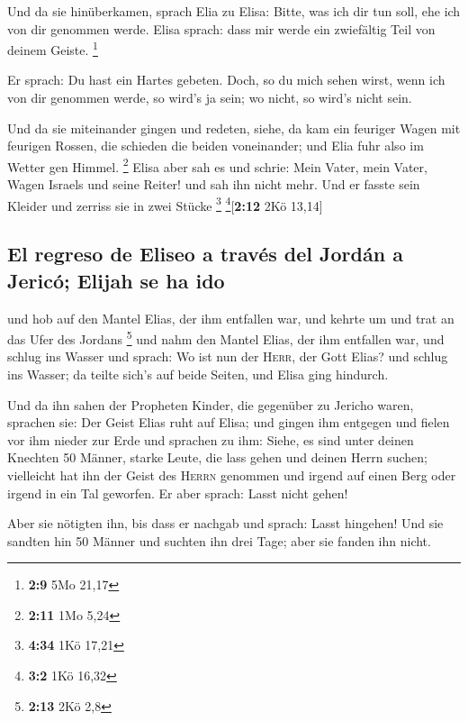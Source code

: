 Und da sie hinüberkamen, sprach Elia zu Elisa: Bitte, was
ich dir tun soll, ehe ich von dir genommen werde. Elisa sprach: dass mir
werde ein zwiefältig Teil von deinem Geiste. \footnote{\textbf{2:9} 5Mo
  21,17}

 Er sprach: Du hast ein Hartes gebeten. Doch, so du mich
sehen wirst, wenn ich von dir genommen werde, so wird's ja sein; wo
nicht, so wird's nicht sein.

 Und da sie miteinander gingen und redeten, siehe, da kam
ein feuriger Wagen mit feurigen Rossen, die schieden die beiden
voneinander; und Elia fuhr also im Wetter gen Himmel. \footnote{\textbf{2:11}
  1Mo 5,24}  Elisa aber sah es und schrie: Mein Vater,
mein Vater, Wagen Israels und seine Reiter! und sah ihn nicht mehr. Und
er fasste sein Kleider und zerriss sie in zwei Stücke \footnote{\textbf{4:34}
  1Kö 17,21} \footnote{\textbf{3:2} 1Kö 16,32}{[}\textbf{2:12} 2Kö
13,14{]}

\hypertarget{el-regreso-de-eliseo-a-travuxe9s-del-jorduxe1n-a-jericuxf3-elijah-se-ha-ido}{%
\subsection{El regreso de Eliseo a través del Jordán a Jericó; Elijah se
ha
ido}\label{el-regreso-de-eliseo-a-travuxe9s-del-jorduxe1n-a-jericuxf3-elijah-se-ha-ido}}

 und hob auf den Mantel Elias, der ihm entfallen war, und
kehrte um und trat an das Ufer des Jordans \footnote{\textbf{2:13} 2Kö
  2,8}  und nahm den Mantel Elias, der ihm entfallen war,
und schlug ins Wasser und sprach: Wo ist nun der \textsc{Herr}, der Gott
Elias? und schlug ins Wasser; da teilte sich's auf beide Seiten, und
Elisa ging hindurch.

 Und da ihn sahen der Propheten Kinder, die gegenüber zu
Jericho waren, sprachen sie: Der Geist Elias ruht auf Elisa; und gingen
ihm entgegen und fielen vor ihm nieder zur Erde  und
sprachen zu ihm: Siehe, es sind unter deinen Knechten 50 Männer, starke
Leute, die lass gehen und deinen Herrn suchen; vielleicht hat ihn der
Geist des \textsc{Herrn} genommen und irgend auf einen Berg oder irgend
in ein Tal geworfen. Er aber sprach: Lasst nicht gehen!

 Aber sie nötigten ihn, bis dass er nachgab und sprach:
Lasst hingehen! Und sie sandten hin 50 Männer und suchten ihn drei Tage;
aber sie fanden ihn nicht.

